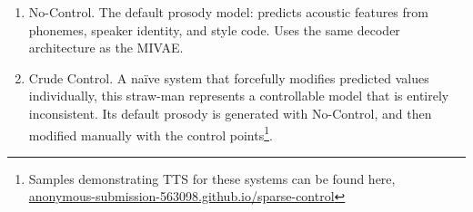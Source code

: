 \documentclass[../thesis.tex]{subfiles}
\begin{document}
\begin{enumerate}
    \item No-Control. The default prosody model: predicts acoustic features from phonemes, speaker identity, and style code. Uses the same decoder architecture as the MIVAE. 
    \item Crude Control. A na\"ive system that forcefully modifies predicted values individually, this straw-man represents a controllable model that is entirely inconsistent. Its default prosody is generated with No-Control, and then modified manually with the control points\footnote{Samples demonstrating TTS for these systems can be found here, \href{https://anonymous-submission-563098.github.io/sparse-control/}{anonymous-submission-563098.github.io/sparse-control}}.
\end{enumerate}



\end{document}
